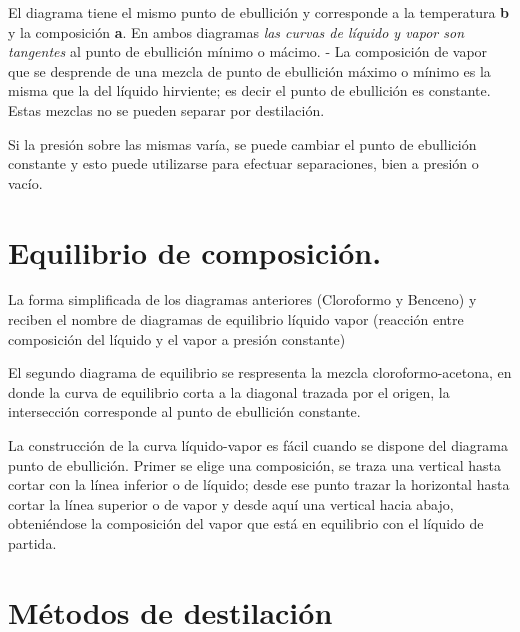 \documentclass[10pt,twocolumn,openany]{book}
\begin{document}
El diagrama tiene el mismo punto de ebullición y corresponde a la temperatura \textbf{b} y la composición \textbf{a}.
En ambos diagramas \textit{las curvas de líquido y vapor son tangentes} al punto de ebullición mínimo o mácimo.
- La composición de vapor que se desprende de una mezcla de punto de ebullición máximo o mínimo es la misma que la del líquido
hirviente; es decir el punto de ebullición es constante.
Estas mezclas no se pueden separar por destilación.

Si la presión sobre las mismas varía, se puede cambiar el punto de ebullición constante y esto puede utilizarse para 
efectuar separaciones, bien a presión o vacío.

\section{Equilibrio de composición.}

La forma simplificada de los diagramas anteriores (Cloroformo y Benceno) y reciben el nombre de diagramas de equilibrio 
líquido vapor (reacción entre composición del líquido y el vapor a presión constante)

El segundo diagrama de equilibrio se respresenta la mezcla cloroformo-acetona, en donde la curva de equilibrio corta a la 
diagonal trazada por el origen, la intersección corresponde al punto de ebullición constante.

La construcción de la curva líquido-vapor es fácil cuando se dispone del diagrama punto de
 ebullición. Primer se elige una composición, se traza una vertical hasta 
 cortar con la línea inferior o de líquido; desde ese punto trazar la horizontal hasta cortar la línea 
 superior o de vapor y desde aquí una vertical hacia abajo, obteniéndose la composición del vapor 
 que está en equilibrio con el líquido de partida.

 \section{Métodos de destilación}
\end{document}
